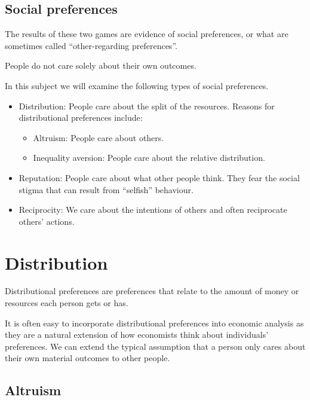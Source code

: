 \documentclass[
  letterpaper,
  DIV=11,
  numbers=noendperiod]{scrreprt}
\begin{document}
\hypertarget{social-preferences-1}{%
\section*{Social preferences}\label{social-preferences-1}}


The results of these two games are evidence of social preferences, or
what are sometimes called ``other-regarding preferences''.

People do not care solely about their own outcomes.

In this subject we will examine the following types of social
preferences.

\begin{itemize}
\item
  Distribution: People care about the split of the resources. Reasons
  for distributional preferences include:

  \begin{itemize}
  \item
    Altruism: People care about others.
  \item
    Inequality aversion: People care about the relative distribution.
  \end{itemize}
\item
  Reputation: People care about what other people think. They fear the
  social stigma that can result from ``selfish'' behaviour.
\item
  Reciprocity: We care about the intentions of others and often
  reciprocate others' actions.
\end{itemize}

\hypertarget{distribution}{%
\chapter{Distribution}\label{distribution}}

Distributional preferences are preferences that relate to the amount of
money or resources each person gets or has.

It is often easy to incorporate distributional preferences into economic
analysis as they are a natural extension of how economists think about
individuals' preferences. We can extend the typical assumption that a
person only cares about their own material outcomes to other people.

\hypertarget{altruism}{%
\section{Altruism}\label{altruism}}
\end{document}
